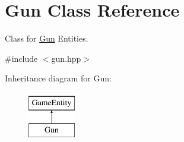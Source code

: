 \hypertarget{class_gun}{}\section{Gun Class Reference}
\label{class_gun}


Class for \mbox{\hyperlink{class_gun}{Gun}} Entities.  




{\ttfamily \#include $<$gun.\+hpp$>$}

Inheritance diagram for Gun\+:\begin{figure}[H]
\begin{center}
\leavevmode
\includegraphics[height=2.000000cm]{class_gun}
\end{center}
\end{figure}
